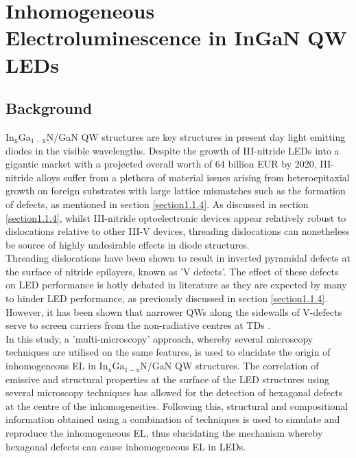 
\chapter{Inhomogeneous Electroluminescence in InGaN QW LEDs}

\ifpdf
    \graphicspath{{Chapter2/Figs/Raster/}{Chapter2/Figs/PDF/}{Chapter2/Figs/}}
\else
    \graphicspath{{Chapter2/Figs/Vector/}{Chapter2/Figs/}}
\fi


\section[Short title]{Background}


$\mathrm{In_{x}Ga_{1-x}N}$/GaN QW structures are key structures in present day light emitting diodes in the visible wavelengths. Despite the growth of III-nitride LEDs into a gigantic market with a projected overall worth of 64 billion EUR by 2020, III-nitride alloys suffer from a plethora of material issues arising from heteroepitaxial growth on foreign substrates with large lattice mismatches \cite{Bennett2010b} such as the formation of defects, as mentioned in section \ref{section1.1.4}. As discussed in section \ref{section1.1.4}, whilst III-nitride optoelectronic devices appear relatively robust to dislocations relative to other III-V devices, threading dislocations can nonetheless be source of highly undesirable effects in diode structures.\\
Threading dislocations have been shown to result in inverted pyramidal defects at the surface of nitride epilayers, known as 'V defects'. The effect of these defects on LED performance is hotly debated in literature as they are expected by many to hinder LED performance, as previously discussed in section \ref{section1.1.4}. However, it has been shown that narrower QWs along the sidewalls of V-defects serve to screen carriers from the non-radiative centres at TDs \cite{Hangleiter2005}.\\
In this study, a 'multi-microscopy' approach, whereby several microscopy techniques are utilised on the same features, is used to elucidate the origin of inhomogeneous EL in $\mathrm{In_{x}Ga_{1-x}N}$/GaN QW structures. The correlation of emissive and structural properties at the surface of the LED structures using several microscopy techniques has allowed for the detection of hexagonal defects at the centre of the inhomogeneities. Following this, structural and compositional information obtained using a combination of techniques is used to simulate and reproduce the inhomogeneous EL, thus elucidating the mechanism whereby hexagonal defects can cause inhomogeneous EL in LEDs.


